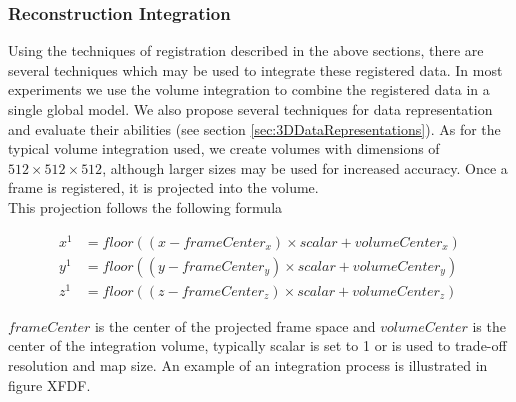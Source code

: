 \subsubsection{Reconstruction Integration}

Using the techniques of registration described in the above sections, there are several techniques which may be used to integrate these registered data. In most experiments we use the volume integration to combine the registered data in a single global model. We also propose several techniques for data representation and evaluate their abilities (see section \ref{sec:3DDataRepresentations}). As for the typical volume integration used, we create volumes with dimensions of $512\times 512\times 512$, although larger sizes may be used for increased accuracy. Once a frame is registered, it is projected into the volume. \\

This projection follows the following formula


\begin{equation} \label{eqn:volIntegration}
\begin{split}
x^{1} & = floor((x - frameCenter_x) \times scalar + volumeCenter_x) \\
y^{1} & = floor((y - frameCenter_y) \times scalar + volumeCenter_y) \\
z^{1} & = floor((z - frameCenter_z) \times scalar + volumeCenter_z)
\end{split}
\end{equation}

$frameCenter$ is the center of the projected frame space and $volumeCenter$ is the center of the integration volume, typically scalar is set to 1 or is used to trade-off resolution and map size. An example of an integration process is illustrated in figure XFDF. 





